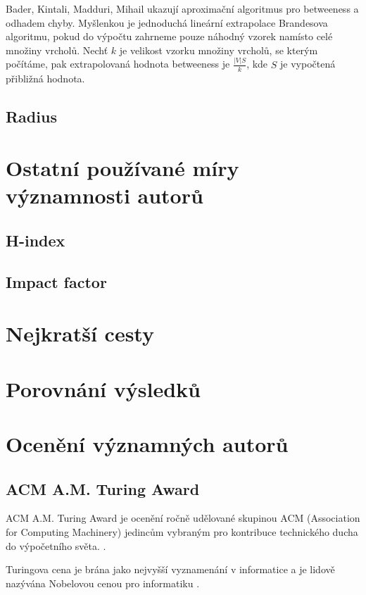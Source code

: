 \documentclass[12pt,titlepage]{report}
\begin{document}
Bader, Kintali, Madduri, Mihail ukazují aproximační algoritmus pro betweeness a
odhadem chyby.  Myšlenkou je jednoduchá lineární extrapolace Brandesova
algoritmu, pokud do výpočtu zahrneme pouze náhodný vzorek namísto celé množiny
vrcholů. Nechť $k$ je velikost vzorku množiny vrcholů, se kterým počítáme, pak
extrapolovaná hodnota betweeness je $\frac{|V| S}{k}$, kde $S$ je vypočtená
přibližná hodnota.

\subsection{Radius}

\section{Ostatní používané míry významnosti autorů}
\subsection{H-index}
\subsection{Impact factor}

\section{Nejkratší cesty}

\section{Porovnání výsledků}

\section{Ocenění významných autorů}
\subsection{ACM A.M. Turing Award}
ACM A.M. Turing Award je ocenění ročně udělované skupinou ACM (Association for
Computing Machinery) jedincům vybraným pro kontribuce technického ducha do
výpočetního světa.
\cite{turingaward}.

Turingova cena je brána jako nejvyšší vyznamenání v informatice a je lidově
nazývána Nobelovou cenou pro informatiku \cite[p.~317]{dasgupta}.
\end{document}
